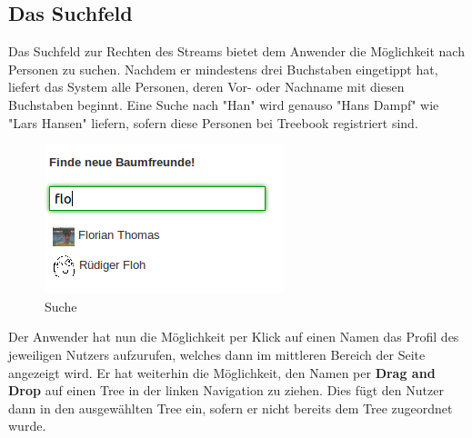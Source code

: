 \documentclass[10pt,a4paper]{book}
\makeatletter
\def\ScaleIfNeeded{%
\ifdim\Gin@nat@width>\linewidth
\linewidth
\else
\Gin@nat@width
\fi
}
\makeatother
\begin{document}
\subsection{Das Suchfeld}
Das Suchfeld zur Rechten des Streams bietet dem Anwender die Möglichkeit nach Personen zu suchen. Nachdem er mindestens drei Buchstaben eingetippt hat, liefert das System alle Personen, deren Vor- oder Nachname mit diesen Buchstaben beginnt. Eine Suche nach "Han" wird genauso "Hans Dampf" wie "Lars Hansen" liefern, sofern diese Personen bei Treebook registriert sind.
\begin{figure}[htbp]
\centering
\includegraphics[width=\ScaleIfNeeded]{Pictures/screen_search.png}%
\caption{Suche}%
\end{figure}
Der Anwender hat nun die Möglichkeit per Klick auf einen Namen das Profil des jeweiligen Nutzers aufzurufen, welches dann im mittleren Bereich der Seite angezeigt wird.
Er hat weiterhin die Möglichkeit, den Namen per \textbf{Drag and Drop} auf einen Tree in der linken Navigation zu ziehen. Dies fügt den Nutzer dann in den ausgewählten Tree ein, sofern er nicht bereits dem Tree zugeordnet wurde.
\end{document}
